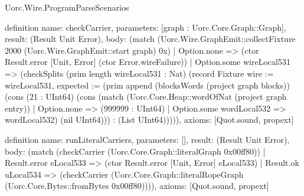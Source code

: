 \begin{lexlean}{Uorc.Wire.ProgramParseScenarios}
\begin{semanticmodule}
definition{
  name: checkCarrier,
  parameters: [graph : Uorc.Core.Graph::Graph],
  result: (Result Unit Error),
  body: (match (Uorc.Wire.GraphEmit::collectFixture 2000 (Uorc.Wire.GraphEmit::start graph) 0x)
    | Option.none => (ctor Result.error [Unit, Error] (ctor Error.wireFailure))
    | Option.some wireLocal531 => (checkSplits (prim length wireLocal531 : Nat) (record Fixture {wire := wireLocal531, expected := (prim append (blocksWords (project graph blocks)) (cons (21 : UInt64) (cons (match (Uorc.Core.Heap::wordOfNat (project graph entry))
      | Option.none => (999999 : UInt64)
      | Option.some wordLocal532 => wordLocal532) (nil UInt64))) : (List UInt64))}))),
  axioms: [Quot.sound, propext]
}

definition{
  name: runLiteralCarriers,
  parameters: [],
  result: (Result Unit Error),
  body: (match (checkCarrier (Uorc.Core.Graph::literalGraph 0x00ff80))
    | Result.error eLocal533 => (ctor Result.error [Unit, Error] eLocal533)
    | Result.ok uLocal534 => (checkCarrier (Uorc.Core.Graph::literalRopeGraph (Uorc.Core.Bytes::fromBytes 0x00ff80)))),
  axioms: [Quot.sound, propext]
}


\end{semanticmodule}
\end{lexlean}

